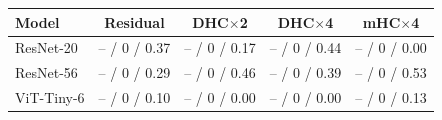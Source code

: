 \begin{tabular}{lcccc}
\toprule
Model & Residual & DHC$\times$2 & DHC$\times$4 & mHC$\times$4 \\
\midrule
ResNet-20 & -- / 0 / 0.37 & -- / 0 / 0.17 & -- / 0 / 0.44 & -- / 0 / 0.00 \\
ResNet-56 & -- / 0 / 0.29 & -- / 0 / 0.46 & -- / 0 / 0.39 & -- / 0 / 0.53 \\
ViT-Tiny-6 & -- / 0 / 0.10 & -- / 0 / 0.00 & -- / 0 / 0.00 & -- / 0 / 0.13 \\
\bottomrule
\end{tabular}
